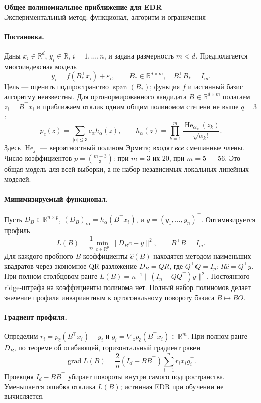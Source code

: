 \documentclass[10pt,a4paper]{article}
\newcommand{\R}{\mathbb R}
\newcommand{\norm}[1]{\lVert#1\rVert}
\begin{document}
\begin{center}
{\Large\bfseries Общее полиномиальное приближение для EDR}\\[3pt]
{\small Экспериментальный метод: функционал, алгоритм и ограничения}
\end{center}

\paragraph{Постановка.}
Даны $x_i\in\R^d$, $y_i\in\R$, $i=1,\dots,n$, и задана размерность $m<d$.
Предполагается многоиндексная модель
\[
 y_i=f(B_*^\top x_i)+\varepsilon_i,\qquad
 B_*\in\R^{d\times m},\quad B_*^\top B_*=I_m.
\]
Цель --- оценить подпространство $\operatorname{span}(B_*)$; функция $f$ и
истинный базис алгоритму неизвестны. Для ортонормированного кандидата
$B\in\R^{d\times m}$ полагаем $z_i=B^\top x_i$ и приближаем отклик одним
общим полиномом степени не выше $q=3$:
\[
 p_c(z)=\sum_{|\alpha|\le 3}c_\alpha h_\alpha(z),\qquad
 h_\alpha(z)=\prod_{k=1}^m
 \frac{\operatorname{He}_{\alpha_k}(z_k)}{\sqrt{\alpha_k!}}.
\]
Здесь $\operatorname{He}_j$ --- вероятностный полином Эрмита; входят \emph{все}
смешанные члены. Число коэффициентов $p=\binom{m+3}{3}$: при $m=3$ их 20,
при $m=5$ --- 56. Это общая модель для всей выборки, а не набор независимых
локальных линейных моделей.

\paragraph{Минимизируемый функционал.}
Пусть $D_B\in\R^{n\times p}$, $(D_B)_{i\alpha}=h_\alpha(B^\top x_i)$, и
$y=(y_1,\ldots,y_n)^\top$. Оптимизируется профиль
\begin{equation}\label{eq:profile}
 \boxed{\displaystyle
 L(B)=\frac1n\min_{c\in\R^p}\norm{D_Bc-y}^2,
 \qquad B^\top B=I_m.}
\end{equation}
Для каждого пробного $B$ коэффициенты $\hat c(B)$ находятся методом
наименьших квадратов через экономное QR-разложение $D_B=QR$, где
$Q^\top Q=I_p$: $R\hat c=Q^\top y$. При полном столбцовом ранге
$L(B)=n^{-1}\norm{(I_n-QQ^\top)y}^2$. Постоянного ridge-штрафа на
коэффициенты полинома нет. Полный набор полиномов делает значение профиля
инвариантным к ортогональному повороту базиса $B\mapsto BO$.

\paragraph{Градиент профиля.}
Определим $r_i=p_{\hat c}(B^\top x_i)-y_i$ и
$g_i=\nabla_zp_{\hat c}(B^\top x_i)\in\R^m$. При полном ранге $D_B$,
по теореме об огибающей, горизонтальный градиент равен
\begin{equation}\label{eq:gradient}
 \operatorname{grad}L(B)=\frac{2}{n}(I_d-BB^\top)
 \sum_{i=1}^n r_i x_i g_i^\top.
\end{equation}
Проекция $I_d-BB^\top$ убирает повороты внутри самого подпространства.
Уменьшается ошибка отклика $L(B)$; истинная EDR при обучении не вычисляется.
\end{document}
